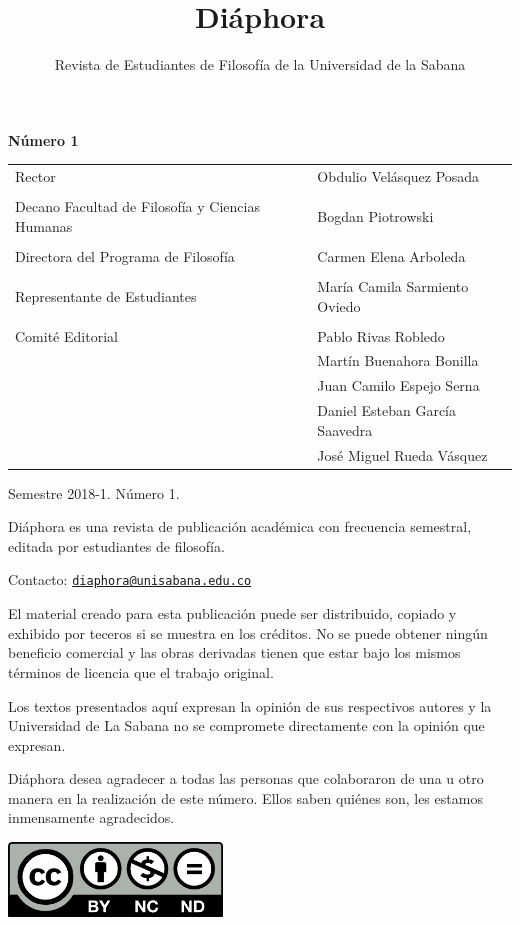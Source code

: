 \documentclass[]{book}
\begin{document}
\pagestyle{fancy}
	
\title{Diáphora}
\author{Revista de Estudiantes de Filosofía de la Universidad de la
Sabana}

\maketitle


\textbf{Número 1}



\begin{longtable}[]{@{}ll@{}}
\toprule
\midrule
\endhead
Rector & Obdulio Velásquez Posada\tabularnewline
&\tabularnewline
Decano Facultad de Filosofía y Ciencias Humanas & Bogdan
Piotrowski\tabularnewline
&\tabularnewline
Directora del Programa de Filosofía & Carmen Elena
Arboleda\tabularnewline
&\tabularnewline
Representante de Estudiantes & María Camila Sarmiento
Oviedo\tabularnewline
&\tabularnewline
Comité Editorial & Pablo Rivas Robledo\tabularnewline
& Martín Buenahora Bonilla\tabularnewline
& Juan Camilo Espejo Serna\tabularnewline
& Daniel Esteban García Saavedra\tabularnewline
& José Miguel Rueda Vásquez\tabularnewline
\bottomrule
\end{longtable}

\noindent Semestre 2018-1. Número 1.

\noindent Diáphora es una revista de publicación académica con frecuencia
semestral, editada por estudiantes de filosofía.

\noindent Contacto: \href{mailto:diaphora@unisabana.edu.co}{\nolinkurl{diaphora@unisabana.edu.co}}



El material creado para esta publicación puede ser distribuido, copiado
y exhibido por teceros si se muestra en los créditos. No se puede
obtener ningún beneficio comercial y las obras derivadas tienen que
estar bajo los mismos términos de licencia que el trabajo original.

Los textos presentados aquí expresan la opinión de sus respectivos
autores y la Universidad de La Sabana no se compromete directamente con
la opinión que expresan.

Diáphora desea agradecer a todas las personas que colaboraron de una u
otro manera en la realización de este número. Ellos saben quiénes son,
les estamos inmensamente agradecidos.
\begin{center}
\includegraphics[width=2.24419in,height=0.78333in]{media/image1.png}
\end{center}
\end{document}
